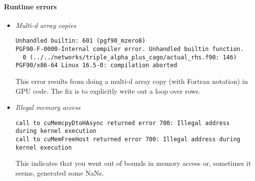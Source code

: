 \paragraph{Runtime errors}

\begin{itemize}

\item {\em Multi-d array copies}
\begin{verbatim}
Unhandled builtin: 601 (pgf90_mzero8)
PGF90-F-0000-Internal compiler error. Unhandled builtin function.       
  0 (../../networks/triple_alpha_plus_cago/actual_rhs.f90: 146)
PGF90/x86-64 Linux 16.5-0: compilation aborted
\end{verbatim}

This error results from doing a multi-d array copy (with Fortran
notation) in GPU code.  The fix is to explicitly write out a loop over
rows.

\item {\em Illegal memory access}

\begin{verbatim}
call to cuMemcpyDtoHAsync returned error 700: Illegal address during kernel execution
call to cuMemFreeHost returned error 700: Illegal address during kernel execution
\end{verbatim}
This indicates that you went out of bounds in memory access or,
sometimes it seems, generated some NaNs.

\end{itemize}

